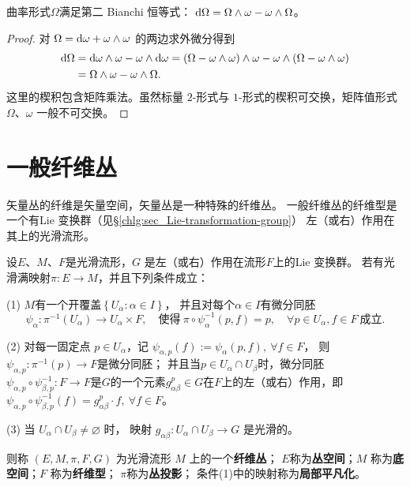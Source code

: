 \begin{theorem}\label{chfb:thm_2ndBianchi}
    曲率形式$\Omega$满足第二 Bianchi 恒等式：
    $ \dd \Omega = \Omega \wedge \omega - \omega \wedge \Omega $。
\end{theorem}
\begin{proof}
对 $\Omega=\dd \omega + \omega \wedge \omega$ 的两边求外微分得到
\begin{align*}
    \dd \Omega & =\dd \omega \wedge \omega- \omega \wedge \dd \omega
     =(\Omega-\omega \wedge \omega) \wedge \omega-\omega \wedge(\Omega-\omega \wedge \omega) \\
    & =\Omega \wedge \omega-\omega \wedge \Omega .
\end{align*}
这里的楔积包含矩阵乘法。虽然标量 $2$-形式与 $1$-形式的楔积可交换，矩阵值形式 $\Omega$、$\omega$ 一般不可交换。
\end{proof}

\section{一般纤维丛}\label{chfb:sec_fb}
矢量丛的纤维是矢量空间，矢量丛是一种特殊的纤维丛。
一般纤维丛的纤维型是一个有Lie 变换群（见\S\ref{chlg:sec_Lie-transformation-group}）
左（或右）作用在其上的光滑流形。

\begin{definition}
    设$E$、$ M$、$ F$是光滑流形，$G$ 是左（或右）作用在流形$F$上的Lie 变换群。
    若有光滑满映射$\pi: E \rightarrow M$，并且下列条件成立：

    (1) $M$有一个开覆盖$\left\{U_\alpha: \alpha \in I\right\}$，
    并且对每个$\alpha \in I$有微分同胚
    \begin{equation*}
        \psi_\alpha: \pi^{-1}(U_\alpha) \to U_\alpha \times F,
        \quad \text{使得}\
        \pi \circ \psi_\alpha^{-1}(p, f)=p, \quad \forall p \in U_\alpha, f \in F
        \ \text{成立}.
    \end{equation*}

    (2) 对每一固定点 $p \in U_\alpha$，记
    $\psi_{\alpha, p}(f) := \psi_\alpha(p, f), \ \forall f \in F$，
    则 $\psi_{\alpha, p}: \pi^{-1}(p)\to F$是微分同胚；
    并且当$p \in U_\alpha \cap U_\beta$时，微分同胚$\psi_{\alpha, p}\circ \psi_{\beta, p}^{-1}:
    F \rightarrow F$是$G$的一个元素$g_{\alpha \beta}^p\in G$在$F$上的左（或右）作用，即
    $\psi_{\alpha, p} \circ \psi_{\beta, p}^{-1}(f)=g^p_{\alpha \beta} \cdot f,
    \ \forall f \in F$。

    (3) 当 $U_\alpha \cap U_\beta \neq \varnothing$ 时，
    映射 $g_{\alpha \beta}: U_\alpha \cap U_\beta \rightarrow G$ 是光滑的。

    则称 $(E, M, \pi, F, G)$ 为光滑流形 $M$ 上的一个\textbf{纤维丛}；
    $E$称为\textbf{丛空间}；$M$ 称为\textbf{底空间}；$F$ 称为\textbf{纤维型}；
    $\pi$称为\textbf{丛投影}；
    条件(1)中的映射称为\textbf{局部平凡化}。
\end{definition}


